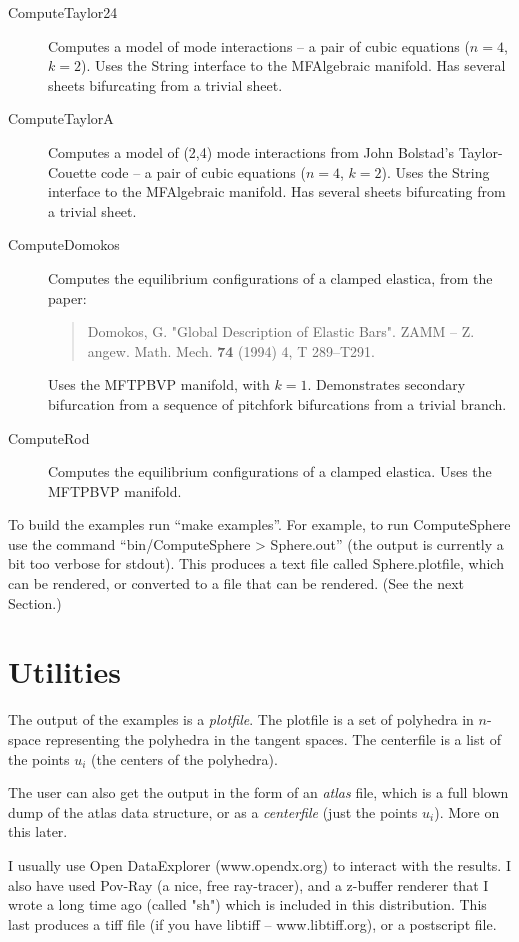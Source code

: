 \documentclass[12pt]{article}
\begin{document}
\begin{description}
  \item[ComputeTaylor24]
     Computes a model of mode interactions -- a pair of cubic equations ($n=4$, $k=2$).
     Uses the String interface to the MFAlgebraic manifold. Has several sheets bifurcating from a trivial sheet.
  \item[ComputeTaylorA]
     Computes a model of (2,4) mode interactions from John Bolstad's Taylor-Couette code -- a pair of cubic equations ($n=4$, $k=2$).
     Uses the String interface to the MFAlgebraic manifold. Has several sheets bifurcating from a trivial sheet.
  \item[ComputeDomokos]
     Computes the equilibrium configurations of a clamped elastica, from the paper:
     \begin{quote}
       Domokos, G. "Global Description of Elastic Bars". ZAMM -- Z. angew. Math. Mech. {\bf 74} (1994) 4, T 289--T291.
     \end{quote}
     Uses the MFTPBVP manifold, with $k=1$. Demonstrates secondary bifurcation from a sequence of pitchfork bifurcations from a 
    trivial branch.
  \item[ComputeRod]
     Computes the equilibrium configurations of a clamped elastica. Uses the MFTPBVP manifold.
\end{description}
To build the examples run ``{make examples}''. For example, to run ComputeSphere use the command
``{bin/ComputeSphere > Sphere.out}'' (the output is currently a bit too verbose for stdout).
This produces a text file called {Sphere.plotfile}, which can be rendered, or converted
to a file that can be rendered. (See the next Section.)

\section{Utilities}

The output of the examples is a {\it plotfile}.
The plotfile is a set of polyhedra in $n$-space representing the polyhedra in the tangent spaces. The
centerfile is a list of the points $u_i$ (the centers of the polyhedra). 

The user can also get the output in the form of an {\it atlas} file, which is a full blown dump of
the atlas data structure, or as a {\it centerfile} (just the points $u_i$). More on this later.

I usually use Open DataExplorer (www.opendx.org) to interact with the results. I also have used Pov-Ray (a nice, free ray-tracer),
and a z-buffer renderer that I wrote a long time ago (called "sh") which is included in this distribution.
This last produces a tiff file (if you have libtiff -- www.libtiff.org), or a postscript file. 
\end{document}
